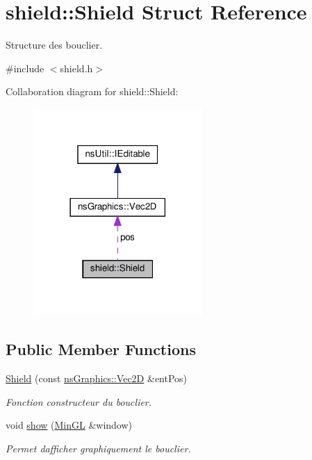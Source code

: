 \hypertarget{structshield_1_1_shield}{}\section{shield\+:\+:Shield Struct Reference}
\label{structshield_1_1_shield}


Structure des bouclier.  




{\ttfamily \#include $<$shield.\+h$>$}



Collaboration diagram for shield\+:\+:Shield\+:
\nopagebreak
\begin{figure}[H]
\begin{center}
\leavevmode
\includegraphics[width=182pt]{structshield_1_1_shield__coll__graph}
\end{center}
\end{figure}
\subsection*{Public Member Functions}
\begin{DoxyCompactItemize}
\item 
\hyperlink{structshield_1_1_shield_addde44a42ca29e8d6474dbd52449aa40}{Shield} (const \hyperlink{classns_graphics_1_1_vec2_d}{ns\+Graphics\+::\+Vec2D} \&ent\+Pos)
\begin{DoxyCompactList}\small\item\em Fonction constructeur du bouclier. \end{DoxyCompactList}\item 
void \hyperlink{structshield_1_1_shield_a768986dee4a088af222f1b987a91d62d}{show} (\hyperlink{class_min_g_l}{Min\+GL} \&window)
\begin{DoxyCompactList}\small\item\em Permet d\textquotesingle{}afficher graphiquement le bouclier. \end{DoxyCompactList}\end{DoxyCompactItemize}
